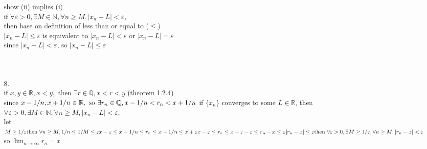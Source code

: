 \documentclass[12pt, border = 4pt, multi]{article} %
\begin{document}
show (ii) implies (i)\\
if $\forall \varepsilon > 0, \exists M \in \mathbb{N}, \forall n \geq M, |x_n - L| < \varepsilon$,\\
then base on definition of less than or equal to ($\leq$)\\
$|x_n - L| \leq \varepsilon$ is equivalent to $|x_n - L| < \varepsilon$ or $|x_n - L| = \varepsilon$\\
since $|x_n - L| < \varepsilon$, so $|x_n - L| \leq \varepsilon$\\
\\
\\
\\
8.\\
if $x, y \in \mathbb{R}, x < y, \text{ then } \exists r \in \mathbb{Q}, x < r < y$ \qquad (theorem 1.2.4)\\
since $x - 1 / n, x + 1 / n \in \mathbb{R}, \text{ so } \exists r_n \in \mathbb{Q}, x - 1 / n < r_n < x + 1 / n\\$
if $\{x_n\}$ converges to some $L \in \mathbb{R}$, then $\forall \varepsilon > 0, \exists M \in \mathbb{N}, \forall n \geq M, |x_n - L| < \varepsilon$,\\
let $M \geq 1 / \varepsilon\\
\text{then } \forall n \geq M, 1 / n \leq 1 / M \leq \varepsilon\\
x - \varepsilon \leq x - 1 / n \leq r_n \leq x + 1 / n \leq x + \varepsilon\\
x - \varepsilon \leq r_n \leq x + \varepsilon\\
-\varepsilon \leq r_n - x \leq \varepsilon\\
|r_n - x| \leq \varepsilon\\
\text{then }\forall \varepsilon > 0, \exists M \geq 1 / \varepsilon, \forall n \geq M, |r_n - x| < \varepsilon$\\
so $\lim_{n \rightarrow \infty} r_n = x$\\
\end{document}
